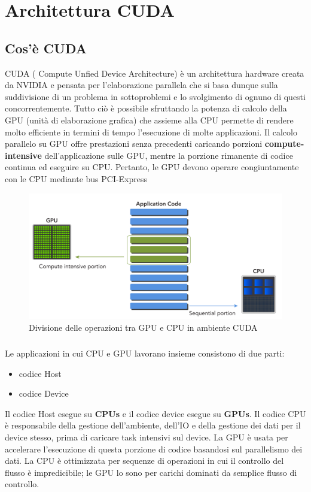 \chapter{Architettura CUDA}
\section{Cos'è CUDA}
CUDA ( Compute Unfied Device Architecture) è un architettura hardware creata da NVIDIA e pensata per l’elaborazione parallela che si basa dunque sulla suddivisione di un problema in sottoproblemi e lo svolgimento di ognuno di questi concorrentemente.
Tutto ciò è possibile sfruttando la potenza di calcolo della GPU (unità di elaborazione grafica) che assieme alla CPU permette di rendere molto efficiente in termini di tempo l’esecuzione di molte applicazioni.
Il calcolo parallelo su GPU offre prestazioni senza precedenti caricando porzioni \textbf{compute-intensive} dell'applicazione sulle GPU, mentre la porzione rimanente di codice continua ed eseguire su CPU. Pertanto, le GPU devono operare congiuntamente con le CPU mediante bus PCI-Express

\begin{figure}[H]
\centering
\includegraphics[scale=0.5]{img/cpu-gpu.png}
\caption{Divisione delle operazioni tra GPU e CPU in ambiente CUDA}
\end{figure}

\paragraph{}
Le applicazioni in cui CPU e GPU lavorano insieme consistono di due parti:
\begin{itemize}
\item codice Host
\item codice Device
\end{itemize}


Il codice Host esegue su \textbf{CPUs} e il codice device esegue su \textbf{GPUs}. Il codice CPU è responsabile della gestione dell'ambiente, dell'IO e della gestione dei dati per il device stesso, prima di caricare task intensivi sul device. La GPU è usata per accelerare l'esecuzione di questa porzione di codice basandosi sul parallelismo dei dati. La CPU è ottimizzata per sequenze di operazioni in cui il controllo del flusso è impredicibile; le GPU lo sono per carichi dominati da semplice flusso di controllo.

